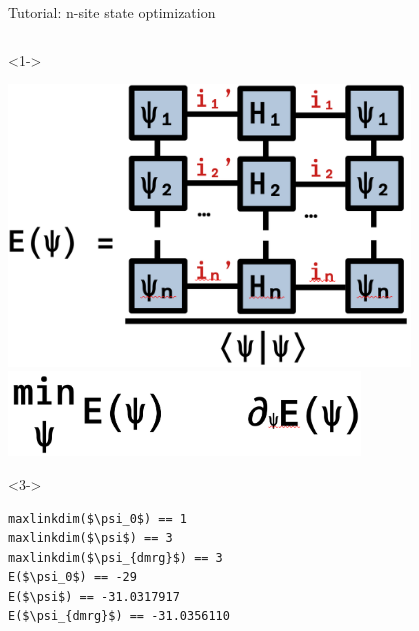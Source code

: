 \begin{frame}[fragile]{Tutorial: n-site state optimization}
\begin{columns}
\begin{column}{5.5cm}
\begin{onlyenv}<1->
\vspace*{0.0cm}
\begin{center}
\includegraphics[width=0.8\textwidth]{
  slides/assets/psin_H_psin.png
} \\
\includegraphics[width=0.7\textwidth]{
  slides/assets/min_grad_E_psi.png
}
\end{center}
\vspace*{0.0cm}
\end{onlyenv}

\begin{onlyenv}<3->
\begin{lstlisting}[language=JuliaLocal, style=julia, mathescape, basicstyle=\small]
maxlinkdim($\psi_0$) == 1
maxlinkdim($\psi$) == 3
maxlinkdim($\psi_{dmrg}$) == 3
E($\psi_0$) == -29
E($\psi$) == -31.0317917
E($\psi_{dmrg}$) == -31.0356110
\end{lstlisting}
~\\
~\\
\end{onlyenv}


\end{column}

\end{columns}

\end{frame}
